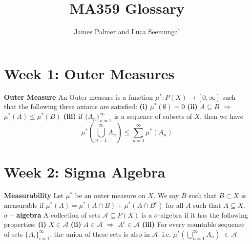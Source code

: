 \documentclass{article}
\title{MA359 Glossary}
\author{James Palmer and Luca Seemungal}
\begin{document}
\maketitle

\section{Week 1: Outer Measures}
\textbf{Outer Measure} An Outer measure is a function $\mu^{*}: P(X) \rightarrow [0, \infty]$ such that the following three axioms are satisfied:
\newline \textbf{(i)} $\mu^{*}(\emptyset) = 0$
\newline \textbf{(ii)} $A \subseteq B$ $\Rightarrow$ $\mu^{*}(A) \leq \mu^{*}(B)$
\newline \textbf{(iii)} if $\{A_n\}_{n=1}^{\infty}$ is a sequence of subsets of $X$, then we have \[ \mu^{*}(\bigcup\limits_{n=1}^{\infty}A_n) \leq \sum_{n=1}^{\infty} \mu^{*}(A_n) \]
\section{Week 2: Sigma Algebra}
\textbf{Measurability} Let $\mu^{*}$ be an outer measure on $X$. We say $B$ such that $B \subset X$ is measurable if $\mu^{*}(A) = \mu^{*}(A \cap B) + \mu^{*}(A \cap B^{c})$ for all $A$ such that $A \subseteq X$.
\newline \newline \textbf{$\sigma-$algebra} A collection of sets $\mathcal{A} \subseteq P(X)$  is a $\sigma$-algebra if it has the following properties:
\newline \textbf{(i)} $X \in \mathcal{A}$
\newline \textbf{(ii)} $A \in \mathcal{A}$ $\Rightarrow$ $A^{c} \in \mathcal{A}$
\newline \textbf{(iii)} For every countable sequence of sets $\{A_i\}_{i=1}^{\infty}$, the union of these sets is also in $\mathcal{A}$. i.e. $\mu^{*}(\bigcup\limits_{n=1}^{\infty}A_n)$ $\in \mathcal{A}$
\end{document}
